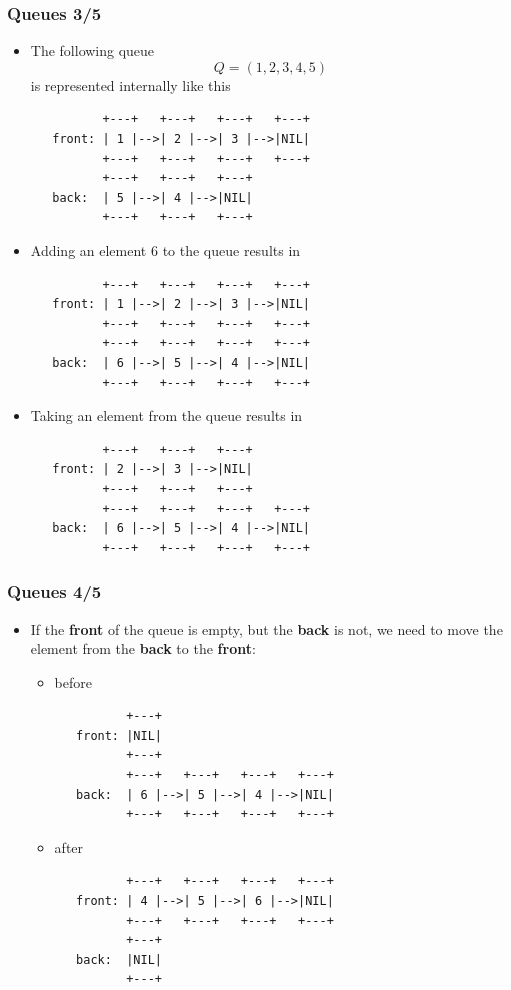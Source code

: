 \documentclass{beamer}
\begin{document}
\begin{frame}[fragile]
  \frametitle{Queues 3/5}
  \begin{itemize}
  \item The following queue
    $$Q = (1, 2, 3, 4, 5)$$
    is represented internally like this
\begin{verbatim}
          +---+   +---+   +---+   +---+            
   front: | 1 |-->| 2 |-->| 3 |-->|NIL|            
          +---+   +---+   +---+   +---+
          +---+   +---+   +---+            
   back:  | 5 |-->| 4 |-->|NIL|            
          +---+   +---+   +---+            
\end{verbatim}
  \item Adding an element $6$ to the queue results in
\begin{verbatim}
          +---+   +---+   +---+   +---+            
   front: | 1 |-->| 2 |-->| 3 |-->|NIL|            
          +---+   +---+   +---+   +---+
          +---+   +---+   +---+   +---+            
   back:  | 6 |-->| 5 |-->| 4 |-->|NIL|            
          +---+   +---+   +---+   +---+            
\end{verbatim}
  \item Taking an element from the queue results in
\begin{verbatim}
          +---+   +---+   +---+            
   front: | 2 |-->| 3 |-->|NIL|            
          +---+   +---+   +---+
          +---+   +---+   +---+   +---+            
   back:  | 6 |-->| 5 |-->| 4 |-->|NIL|            
          +---+   +---+   +---+   +---+            
\end{verbatim}
  \end{itemize}
\end{frame}

\begin{frame}[fragile]
  \frametitle{Queues 4/5}
  \begin{itemize}
  \item If the \textbf{front} of the queue is empty, but the \textbf{back} is
    not, we need to move the element from the \textbf{back} to the
    \textbf{front}:
    \begin{itemize}
    \item before
\begin{verbatim}
          +---+            
   front: |NIL|            
          +---+
          +---+   +---+   +---+   +---+            
   back:  | 6 |-->| 5 |-->| 4 |-->|NIL|            
          +---+   +---+   +---+   +---+            
\end{verbatim}
    \item after
\begin{verbatim}
          +---+   +---+   +---+   +---+            
   front: | 4 |-->| 5 |-->| 6 |-->|NIL|            
          +---+   +---+   +---+   +---+            
          +---+            
   back:  |NIL|            
          +---+
\end{verbatim}
    \end{itemize}
  \end{itemize}
\end{frame}
\end{document}
